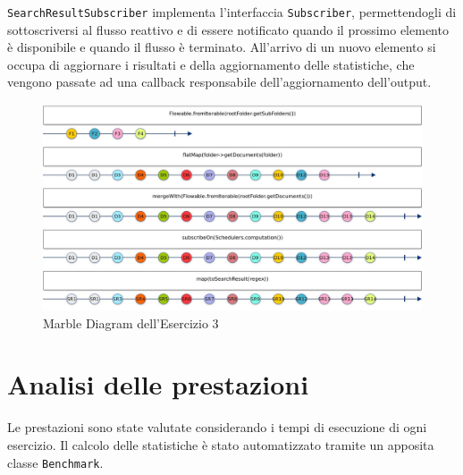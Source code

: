﻿\documentclass[a4paper]{article}
\begin{document}
\texttt{SearchResultSubscriber} implementa l'interfaccia \texttt{Subscriber}, permettendogli di sottoscriversi al flusso reattivo e di essere notificato quando il prossimo elemento \`e disponibile e quando il flusso \`e terminato.
%
All'arrivo di un nuovo elemento si occupa di aggiornare i risultati e della aggiornamento delle statistiche, che vengono passate ad una callback responsabile dell'aggiornamento dell'output.

\begin{figure}[H]

    \centering

    \includegraphics[width=\linewidth, height=\textheight,keepaspectratio]{ReactiveStreams}

    \caption{Marble Diagram dell'Esercizio 3}

    \label{fig:event-loop}

\end{figure}

\section{Analisi delle prestazioni}\label{analisi-delle-prestazioni}

Le prestazioni sono state valutate considerando i tempi di esecuzione di ogni esercizio.
%
Il calcolo delle statistiche \`e stato automatizzato tramite un apposita classe \texttt{Benchmark}.
\end{document}
